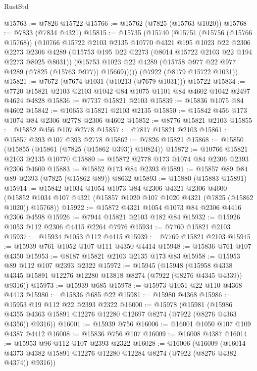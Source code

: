 \begin{lexlean}{RustStd}
\begin{coremodule}
@15763 := @7826 @15722
@15766 := @15762 (@7825 (@15763 @1020))
@15768 := @7833 (@7834 @4321)
@15815 := @15735
    (@15740
      (@15751
        (@15756 (@15766 @15768))
        (@10766
          @15722
          @2103
          @2135
          @10770
          @4321
          @195
          @1023
          @22
          @2306
          @2273
          @2306
          @4289
          (@15753 @195 @22 @2273 (@8014 @15722 @2103 @22 @194 @2273 @8025 @8031))
          (@15753 @1023 @22 @4289 (@15758 @977 @22 @977 @4289 (@7825 (@15763 @977)) @15669)))))
    (@7922 (@8179 @15722 @1031))
@15821 := @7672 (@7674 @1031 (@10213 (@7679 @1031))) @15722
@15834 := @7720 @15821 @2103 @2103 @1042 @84 @1075 @1101 @84 @4602 @1042 @2497 @4624 @4828
@15836 := @7737 @15821 @2103
@15839 := @15836 @1075 @84 @4602
@15842 := @10653 @15821 @2103 @2135
@15850 := @15842 @456 @173 @1074 @84 @2306 @2778 @2306 @4602
@15852 := @8776 @15821 @2103
@15855 := @15852 @456 @107 @2778
@15857 := @7817 @15821 @2103
@15861 := @15857 @393 @107 @393 @2778
@15862 := @7826 @15821
@15868 := @15850 (@15855 (@15861 (@7825 (@15862 @393)) @10824))
@15872 := @10766 @15821 @2103 @2135 @10770
@15880 := @15872 @2778 @173 @1074 @84 @2306 @2393 @2306 @4600
@15883 := @15852 @173 @84 @2393
@15891 := @15857 @89 @84 @89 @2393 (@7825 (@15862 @89)) @8632
@15893 := @15880 (@15883 @15891)
@15914 := @15842
    @1034
    @1054
    @1073
    @84
    @2306
    @4321
    @2306
    @4600
    (@15852 @1034 @107 @4321 (@15857 @1020 @107 @1020 @4321 (@7825 (@15862 @1020)) @15768))
@15922 := @15872 @4321 @1054 @1073 @84 @2306 @4416 @2306 @4598
@15926 := @7944 @15821 @2103 @182 @84
@15932 := @15926 @1053 @112 @2306 @4415 @2264 @7976
@15934 := @7760 @15821 @2103
@15937 := @15934 @1053 @112 @4415
@15939 := @7769 @15821 @2103
@15945 := @15939 @761 @1052 @107 @111 @4350 @4414
@15948 := @15836 @761 @107 @4350
@15953 := @8187 @15821 @2103 @2135 @173 @83
@15958 := @15953 @89 @112 @107 @2393 @2322
@15972 := @15945
    (@15948
      (@15958 @4338 @4345 @15891 @12276 @12280 @13818 @8274 (@7922 (@8276 @4345 @4339)) @9316))
@15973 := @15939 @685
@15978 := @15973 @1051 @22 @110 @4368 @4413
@15980 := @15836 @685 @22
@15981 := @15980 @4368
@15986 := @15953 @19 @112 @22 @2393 @2322
@16000 := @15978
    (@15981
      (@15986 @4355 @4363 @15891 @12276 @12280 @12697 @8274 (@7922 (@8276 @4363 @4356)) @9316))
@16001 := @15939 @756
@16006 := @16001 @1050 @107 @109 @4387 @4412
@16008 := @15836 @756 @107
@16009 := @16008 @4387
@16014 := @15953 @96 @112 @107 @2393 @2322
@16028 := @16006
    (@16009
      (@16014 @4373 @4382 @15891 @12276 @12280 @12284 @8274 (@7922 (@8276 @4382 @4374)) @9316))

\end{coremodule}
\end{lexlean}
